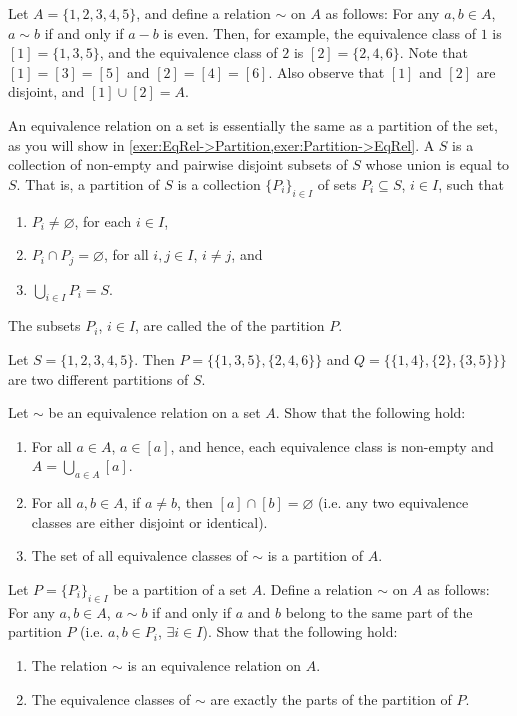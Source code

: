 \begin{Example}
Let $A = \{1, 2, 3, 4, 5\}$, and define a relation $\sim$ on $A$ as follows: For any $a, b \in A$, $a \sim b$ if and only if $a - b$ is even. Then, for example, the equivalence class of $1$ is $[1] = \{1, 3, 5\}$, and the equivalence class of $2$ is $[2] = \{2, 4, 6\}$. Note that $[1] = [3] = [5]$ and $[2] = [4] = [6]$. Also observe that $[1]$ and $[2]$ are disjoint, and $[1] \cup [2] = A$.
\end{Example}

An equivalence relation on a set is essentially the same as a partition of the set, as you will show in \cref{exer:EqRel->Partition,exer:Partition->EqRel}. A  $S$ is a collection of non-empty and pairwise disjoint subsets of $S$ whose union is equal to $S$. That is, a partition of $S$ is a collection $\{P_i\}_{i \in I}$ of sets $P_i \subseteq S$, $i \in I$, such that
\begin{enumerate}
\item $P_i \ne \varnothing$, for each $i \in I$,
\item $P_i \cap P_j = \varnothing$, for all $i, j \in I$, $i \ne j$, and
\item $\bigcup_{i \in I} P_i = S$.
\end{enumerate}
The subsets $P_i$, $i \in I$, are called the  of the partition $P$.

\begin{Example}
Let $S = \{1, 2, 3, 4, 5\}$. Then $P = \{\{1, 3, 5\}, \{2, 4, 6\}\}$ and $Q = \{\{1, 4\}, \{2\}, \{3, 5\}\}\}$ are two different partitions of $S$.
\end{Example}

\begin{Exercise}\label{exer:EqRel->Partition}
Let $\sim$ be an equivalence relation on a set $A$. Show that the following hold:
\begin{enumerate}
\item For all $a \in A$, $a \in [a]$, and hence, each equivalence class is non-empty and $A = \bigcup_{a \in A} [a]$.
\item For all $a, b \in A$, if $a \ne b$, then $[a] \cap [b] = \varnothing$ (i.e. any two equivalence classes are either disjoint or identical).
\item The set of all equivalence classes of $\sim$ is a partition of $A$.
\end{enumerate}
\end{Exercise}

\begin{Exercise}\label{exer:Partition->EqRel}
Let $P = \{P_i\}_{i \in I}$ be a partition of a set $A$. Define a relation $\sim$ on $A$ as follows: For any $a, b \in A$, $a \sim b$ if and only if $a$ and $b$ belong to the same part of the partition $P$ (i.e. $a, b \in P_i$, $\exists i \in I$). Show that the following hold:
\begin{enumerate}
\item The relation $\sim$ is an equivalence relation on $A$.
\item The equivalence classes of $\sim$ are exactly the parts of the partition of $P$.
\end{enumerate}
\end{Exercise}

